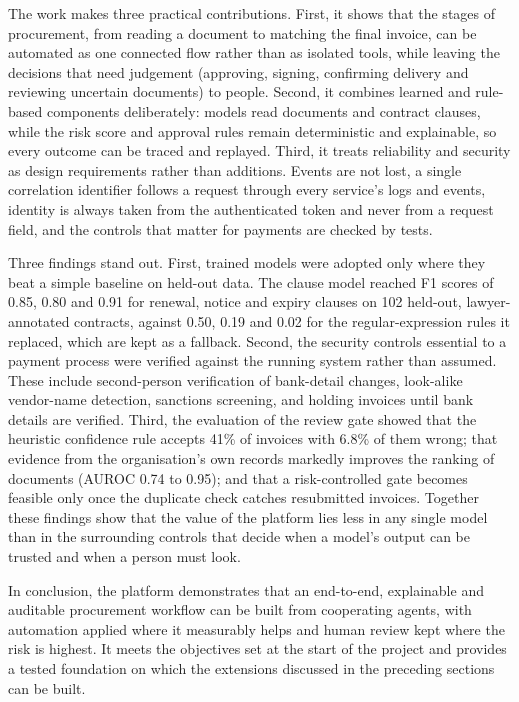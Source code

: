 The work makes three practical contributions. First, it shows that the stages of procurement, from reading a document to matching the final invoice, can be automated as one connected flow rather than as isolated tools, while leaving the decisions that need judgement (approving, signing, confirming delivery and reviewing uncertain documents) to people. Second, it combines learned and rule-based components deliberately: models read documents and contract clauses, while the risk score and approval rules remain deterministic and explainable, so every outcome can be traced and replayed. Third, it treats reliability and security as design requirements rather than additions. Events are not lost, a single correlation identifier follows a request through every service's logs and events, identity is always taken from the authenticated token and never from a request field, and the controls that matter for payments are checked by tests.

Three findings stand out. First, trained models were adopted only where they beat a simple baseline on held-out data. The clause model reached F1 scores of 0.85, 0.80 and 0.91 for renewal, notice and expiry clauses on 102 held-out, lawyer-annotated contracts, against 0.50, 0.19 and 0.02 for the regular-expression rules it replaced, which are kept as a fallback. Second, the security controls essential to a payment process were verified against the running system rather than assumed. These include second-person verification of bank-detail changes, look-alike vendor-name detection, sanctions screening, and holding invoices until bank details are verified. Third, the evaluation of the review gate showed that the heuristic confidence rule accepts 41\% of invoices with 6.8\% of them wrong; that evidence from the organisation's own records markedly improves the ranking of documents (AUROC 0.74 to 0.95); and that a risk-controlled gate becomes feasible only once the duplicate check catches resubmitted invoices. Together these findings show that the value of the platform lies less in any single model than in the surrounding controls that decide when a model's output can be trusted and when a person must look.

In conclusion, the platform demonstrates that an end-to-end, explainable and auditable procurement workflow can be built from cooperating agents, with automation applied where it measurably helps and human review kept where the risk is highest. It meets the objectives set at the start of the project and provides a tested foundation on which the extensions discussed in the preceding sections can be built.

